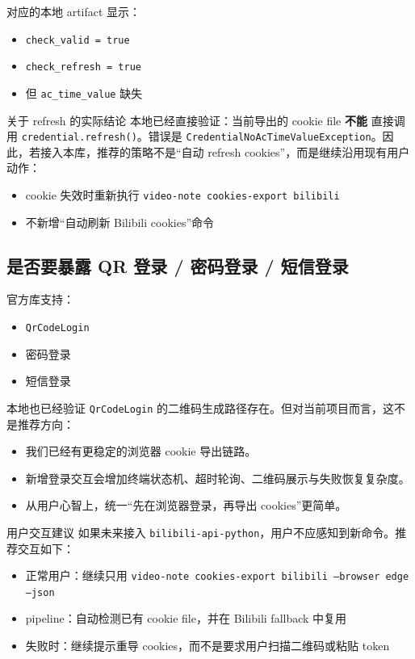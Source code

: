 \documentclass[a4paper]{article}
\begin{document}
对应的本地 artifact 显示：
\begin{itemize}
\item \texttt{check\_valid = true}
\item \texttt{check\_refresh = true}
\item 但 \texttt{ac\_time\_value} 缺失
\end{itemize}

\begin{riskbox}{关于 refresh 的实际结论}
本地已经直接验证：当前导出的 cookie file \textbf{不能} 直接调用 \texttt{credential.refresh()}。错误是 \texttt{CredentialNoAcTimeValueException}。因此，若接入本库，推荐的策略不是“自动 refresh cookies”，而是继续沿用现有用户动作：
\begin{itemize}
\item cookie 失效时重新执行 \texttt{video-note cookies-export bilibili}
\item 不新增“自动刷新 Bilibili cookies”命令
\end{itemize}
\end{riskbox}

\subsection{是否要暴露 QR 登录 / 密码登录 / 短信登录}

官方库支持：
\begin{itemize}
\item \texttt{QrCodeLogin}
\item 密码登录
\item 短信登录
\end{itemize}

本地也已经验证 \texttt{QrCodeLogin} 的二维码生成路径存在。但对当前项目而言，这不是推荐方向：
\begin{itemize}
\item 我们已经有更稳定的浏览器 cookie 导出链路。
\item 新增登录交互会增加终端状态机、超时轮询、二维码展示与失败恢复复杂度。
\item 从用户心智上，统一“先在浏览器登录，再导出 cookies”更简单。
\end{itemize}

\begin{findingbox}{用户交互建议}
如果未来接入 \texttt{bilibili-api-python}，用户不应感知到新命令。推荐交互如下：
\begin{itemize}
\item 正常用户：继续只用 \texttt{video-note cookies-export bilibili --browser edge --json}
\item pipeline：自动检测已有 cookie file，并在 Bilibili fallback 中复用
\item 失败时：继续提示重导 cookies，而不是要求用户扫描二维码或粘贴 token
\end{itemize}
\end{findingbox}
\end{document}
